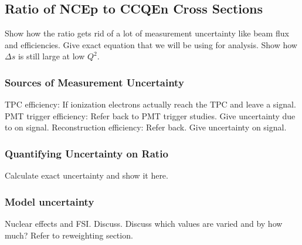 \subsection{Ratio of NCEp to CCQEn Cross Sections}\label{sec:ratios}
  Show how the ratio gets rid of a lot of measurement uncertainty like beam
  flux and efficiencies. Give exact equation that we will be using for
  analysis. Show how $\Delta s$ is still large at low $Q^2$.
  \subsubsection{Sources of Measurement Uncertainty}
    TPC efficiency: If ionization electrons actually reach the
    TPC and leave a signal.
    PMT trigger efficiency: Refer back to PMT trigger studies. Give uncertainty
    due to on signal.
    Reconstruction efficiency: Refer back. Give uncertainty on signal.
  \subsubsection{Quantifying Uncertainty on Ratio}\label{errorcalc}
    Calculate exact uncertainty and show it here.
  \subsubsection{Model uncertainty}\label{sec:modeluncertainty}
    Nuclear effects and FSI. Discuss. Discuss which values are varied and by
    how much? Refer to reweighting section. 

